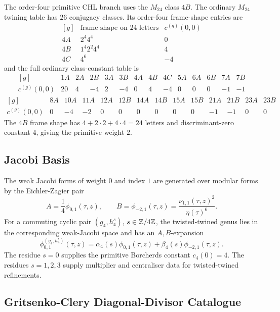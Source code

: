 The order-four primitive CHL branch uses the \(M_{24}\) class \(4B\).
The ordinary \(M_{24}\) twining table has \(26\) conjugacy classes.  Its
order-four frame-shape entries are
\[
\begin{array}{c|c|c}
[g] & \text{frame shape on }24\text{ letters} & c^{(g)}(0,0)\\
\hline
4A & 2^4 4^4 & 0\\
4B & 1^4 2^2 4^4 & 4\\
4C & 4^6 & -4
\end{array}
\]
and the full ordinary class-constant table is
\[
\begin{array}{c|rrrrrrrrrrrrr}
[g] &1A&2A&2B&3A&3B&4A&4B&4C&5A&6A&6B&7A&7B\\
\hline
c^{(g)}(0,0)&20&4&-4&2&-4&0&4&-4&0&0&0&-1&-1
\end{array}
\]
\[
\begin{array}{c|rrrrrrrrrrrrr}
[g] &8A&10A&11A&12A&12B&14A&14B&15A&15B&21A&21B&23A&23B\\
\hline
c^{(g)}(0,0)&0&-4&-2&0&0&0&0&0&0&-1&-1&0&0
\end{array}
\]
The \(4B\) frame shape has \(4+2\cdot 2+4\cdot 4=24\) letters and
discriminant-zero constant \(4\), giving the primitive weight \(2\).

\subsection*{Jacobi Basis}

The weak Jacobi forms of weight \(0\) and index \(1\) are generated over
modular forms by the Eichler-Zagier pair
\[
  A=\frac{1}{4}\phi_{0,1}(\tau,z),
  \qquad
  B=\phi_{-2,1}(\tau,z)
   =\frac{\nu_{1,1}(\tau,z)^2}{\eta(\tau)^6}.
\]
For a commuting cyclic pair \((g_4,h_4^s)\), \(s\in\mathbb{Z}/4\mathbb{Z}\), the
twisted-twined genus lies in the corresponding weak-Jacobi space and
has an \(A,B\)-expansion
\[
  \phi^{(g_4,h_4^s)}_{0,1}(\tau,z)
  =
  \alpha_4(s)\phi_{0,1}(\tau,z)
  +
  \beta_4(s)\phi_{-2,1}(\tau,z).
\]
The residue \(s=0\) supplies the primitive Borcherds constant
\(c_4(0)=4\).  The residues \(s=1,2,3\) supply multiplier and
centraliser data for twisted-twined refinements.

\subsection*{Gritsenko-Clery Diagonal-Divisor Catalogue}

